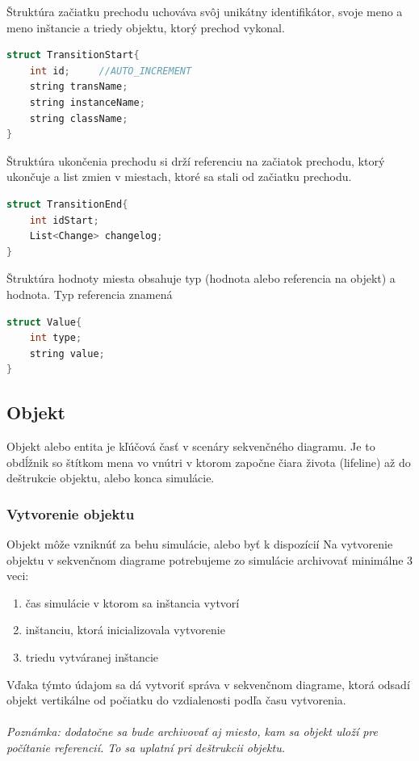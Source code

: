 Štruktúra začiatku prechodu uchováva svôj unikátny identifikátor, svoje meno a meno inštancie a triedy objektu, ktorý prechod vykonal.

\begin{lstlisting}[language=C++]
struct TransitionStart{
	int id;		//AUTO_INCREMENT
	string transName;
	string instanceName;
	string className;
}
\end{lstlisting}

Štruktúra ukončenia prechodu si drží referenciu na začiatok prechodu, ktorý ukončuje a list zmien v miestach, ktoré sa stali od začiatku prechodu.
\begin{lstlisting}[language=C++]
struct TransitionEnd{
	int idStart;
	List<Change> changelog;
}
\end{lstlisting}

Štruktúra hodnoty miesta obsahuje typ (hodnota alebo referencia na objekt) a hodnota. Typ referencia znamená 
\begin{lstlisting}[language=C++]
struct Value{
	int type;
	string value;
}
\end{lstlisting}


\subsection*{Objekt}
Objekt alebo entita je kľúčová časť v scenáry sekvenčného diagramu. Je to obdĺžnik so štítkom mena vo vnútri v ktorom započne čiara života (lifeline) až do deštrukcie objektu, alebo konca simulácie.

\subsubsection*{Vytvorenie objektu}
Objekt môže vzniknúť za behu simulácie, alebo byť k dispozícií
Na vytvorenie objektu v sekvenčnom diagrame potrebujeme zo simulácie archivovať minimálne 3 veci:

\begin{enumerate}
	\item čas simulácie v ktorom sa inštancia vytvorí
	\item inštanciu, ktorá inicializovala vytvorenie
	\item triedu vytváranej inštancie
\end{enumerate}
Vďaka týmto údajom sa dá vytvoriť správa v sekvenčnom diagrame, ktorá odsadí objekt vertikálne od počiatku do vzdialenosti podľa času vytvorenia.\\\\
\textit{Poznámka: dodatočne sa bude archivovať aj miesto, kam sa objekt uloží pre počítanie referencií. To sa uplatní pri deštrukcii objektu.}


